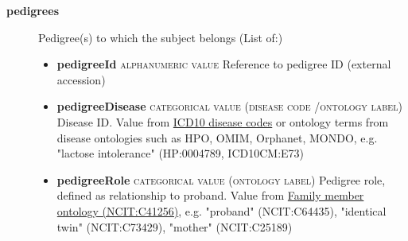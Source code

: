 \documentclass[a4paper, 10pt]{article}        %
\begin{document}
\begin{description}
	\item[\textbf{pedigrees}] Pedigree(s) to which the subject belongs (List of:)
	\begin{itemize}
			\item[] \textbf{pedigreeId} {\textsc{alphanumeric value}} Reference to pedigree ID (external accession) 
			\item[] \textbf{pedigreeDisease} {\textsc{categorical value (disease code /ontology label)}} Disease ID. Value from \href{https://www.who.int/classifications/icd/en/}{ICD10 disease codes} or ontology terms from disease ontologies such as HPO, OMIM, Orphanet, MONDO, e.g. "lactose intolerance" (HP:0004789, ICD10CM:E73)
			\item[] \textbf{pedigreeRole} {\textsc{categorical value (ontology label)}} Pedigree role, defined as relationship to proband. Value from \href{https://www.ebi.ac.uk/ols/ontologies/ncit/terms?iri=http%3A%2F%2Fpurl.obolibrary.org%2Fobo%2FNCIT_C41256}{Family member ontology (NCIT:C41256)}, e.g. "proband" (NCIT:C64435), "identical twin" (NCIT:C73429), "mother" (NCIT:C25189)
			

\end{itemize}
\end{description}
\end{document}
